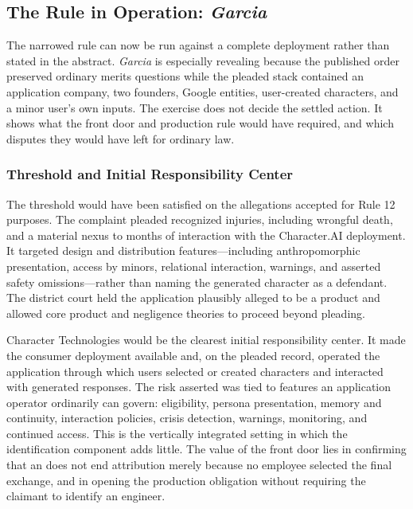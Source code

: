 \subsection{The Rule in Operation: \emph{Garcia}}

The narrowed rule can now be run against a complete deployment rather than stated in the abstract. \emph{Garcia} is especially revealing because the published order preserved ordinary merits questions while the pleaded stack contained an application company, two founders, Google entities, user-created characters, and a minor user's own inputs. The exercise does not decide the settled action. It shows what the front door and production rule would have required, and which disputes they would have left for ordinary law.

\subsubsection{Threshold and Initial Responsibility Center}

The threshold would have been satisfied on the allegations accepted for Rule 12 purposes. The complaint pleaded recognized injuries, including wrongful death, and a material nexus to months of interaction with the Character.AI deployment. It targeted design and distribution features---including anthropomorphic presentation, access by minors, relational interaction, warnings, and asserted safety omissions---rather than naming the generated character as a defendant. The district court held the application plausibly alleged to be a product and allowed core product and negligence theories to proceed beyond pleading.

Character Technologies would be the clearest initial responsibility center. It made the consumer deployment available and, on the pleaded record, operated the application through which users selected or created characters and interacted with generated responses. The risk asserted was tied to features an application operator ordinarily can govern: eligibility, persona presentation, memory and continuity, interaction policies, crisis detection, warnings, monitoring, and continued access. This is the vertically integrated setting in which the identification component adds little. The value of the front door lies in confirming that an  does not end attribution merely because no employee selected the final exchange, and in opening the production obligation without requiring the claimant to identify an engineer.

